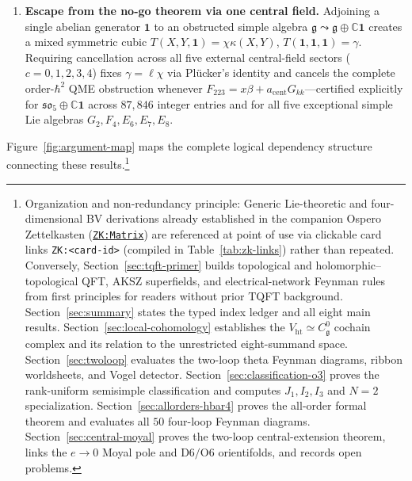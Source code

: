 \documentclass[11pt,letterpaper]{article}
\numberwithin{equation}{section}
\theoremstyle{plain}
\theoremstyle{definition}
\theoremstyle{remark}
\newcommand{\fg}{\mathfrak{g}}
\newcommand{\fso}{\mathfrak{so}}
\newcommand{\Vht}{V_{\mathrm{ht}}}
\newcommand{\Cg}{C^0_{\fg}}
\newcommand{\zkmat}{\href{http://127.0.0.1:9124/?view=matrix}{\texttt{ZK:Matrix}}}
\begin{document}
\begin{enumerate}[leftmargin=*]
  \item \textbf{Escape from the no-go theorem via one central field.} Adjoining a single abelian generator $\mathbf{1}$ to an obstructed simple algebra $\fg \leadsto \fg \oplus \mathbb{C}\mathbf{1}$ creates a mixed symmetric cubic $T(X,Y,\mathbf{1}) = \chi\kappa(X,Y)$, $T(\mathbf{1},\mathbf{1},\mathbf{1}) = \gamma$. Requiring cancellation across all five external central-field sectors ($c = 0,1,2,3,4$) fixes $\gamma = \ell\chi$ via Pl\"ucker's identity and cancels the complete order-$\hbar^2$ QME obstruction whenever $F_{223} = x\beta + a_{\mathrm{cent}}G_{kk}$---certified explicitly for $\fso_5 \oplus \mathbb{C}\mathbf{1}$ across $87,846$ integer entries and for all five exceptional simple Lie algebras $G_2, F_4, E_6, E_7, E_8$.
\end{enumerate}

Figure~\ref{fig:argument-map} maps the complete logical dependency structure connecting these results.\footnote{Organization and non-redundancy principle: Generic Lie-theoretic and four-dimensional BV derivations already established in the companion Ospero Zettelkasten (\zkmat) are referenced at point of use via clickable card links \texttt{ZK:<card-id>} (compiled in Table~\ref{tab:zk-links}) rather than repeated. Conversely, Section~\ref{sec:tqft-primer} builds topological and holomorphic--topological QFT, AKSZ superfields, and electrical-network Feynman rules from first principles for readers without prior TQFT background. Section~\ref{sec:summary} states the typed index ledger and all eight main results. Section~\ref{sec:local-cohomology} establishes the $\Vht \simeq \Cg$ cochain complex and its relation to the unrestricted eight-summand space. Section~\ref{sec:twoloop} evaluates the two-loop theta Feynman diagrams, ribbon worldsheets, and Vogel detector. Section~\ref{sec:classification-o3} proves the rank-uniform semisimple classification and computes $J_1, I_2, I_3$ and $N=2$ specialization. Section~\ref{sec:allorders-hbar4} proves the all-order formal theorem and evaluates all $50$ four-loop Feynman diagrams. Section~\ref{sec:central-moyal} proves the two-loop central-extension theorem, links the $e \to 0$ Moyal pole and $\mathrm{D}6/\mathrm{O}6$ orientifolds, and records open problems.}
\end{document}
